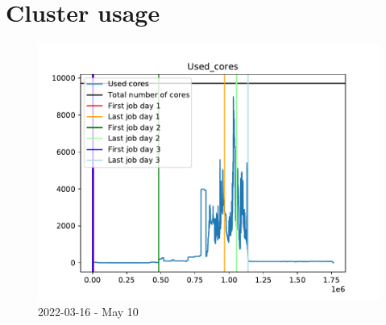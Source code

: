 \documentclass[a4paper]{article}
\begin{document}

\section{Cluster usage}
\begin{figure}[H] 
    \includegraphics[width=1.11\linewidth]{MBSS/plot/Used_cores_2022-03-16.pdf}\caption{2022-03-16 - May 10} 
\end{figure}
\end{document}
